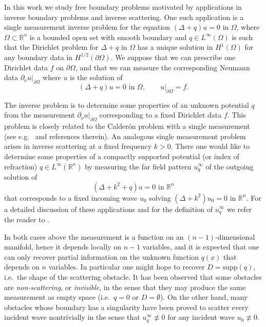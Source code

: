 \documentclass[11pt,a4paper]{amsart}
\theoremstyle{definition}
\numberwithin{equation}{section}
\newcommand{\mR}{\mathbb{R}}                    %
\newcommand{\supp}{\mathrm{supp}}
\newcommand{\p}{\partial}
\begin{document}
In this work we study free boundary problems motivated by applications in inverse boundary problems and inverse scattering. One such application is a single measurement inverse problem for the equation $(\Delta+q)u = 0$ in $\Omega$, where $\Omega \subset \mR^n$ is a bounded open set with smooth boundary and $q \in L^{\infty}(\Omega)$ is such that the Dirichlet problem for $\Delta+q$ in $\Omega$ has a unique solution in $H^1(\Omega)$ for any boundary data in $H^{1/2}(\p \Omega)$. We suppose that we can prescribe one Dirichlet data $f$ on $\p \Omega$, and that we can measure the corresponding Neumann data $\p_{\nu} u|_{\p \Omega}$ where $u$ is the solution of 
\[
(\Delta+q)u = 0 \text{ in $\Omega$}, \qquad u|_{\p \Omega} = f.
\]

The inverse problem is to determine some properties of an unknown potential $q$ from the measurement $\p_{\nu} u|_{\p \Omega}$ corresponding to a fixed Dirichlet data $f$. This problem is closely related to the Calder\'on problem with a single measurement (see e.g.\ \cite{Alessandrini1999, LiuTsou2020} and references therein). An analogous single measurement problem arises in inverse scattering at a fixed frequency $k > 0$. There one would like to determine some properties of a compactly supported potential (or index of refraction) $q \in L^{\infty}(\mR^n)$ by measuring the far field pattern $u_q^{\infty}$ of the outgoing solution of 
\[
(\Delta+k^2+q) u = 0 \text{ in $\mR^n$}
\]
that corresponds to a fixed incoming wave $u_0$ solving $(\Delta+k^2)u_0 = 0$ in $\mR^n$. For a detailed discussion of these applications and for the definition of $u_q^{\infty}$ we refer the reader to \cite{SaloShahgholian}. 

In both cases above the measurement is a function on an $(n-1)$-dimensional manifold, hence it depends locally on $n-1$ variables, and it is expected that one can only recover partial information on the unknown function $q(x)$ that depends on $n$ variables. In particular one might hope to recover $D = \supp(q)$, i.e.\ the shape of the scattering obstacle. It has been observed that some obstacles are \emph{non-scattering}, or \emph{invisible}, in the sense that they may produce the same measurement as empty space (i.e.\ $q=0$ or $D = \emptyset$). On the other hand, many obstacles whose boundary has a singularity have been proved to scatter every incident wave nontrivially in the sense that $u_q^{\infty} \not\equiv 0$ for any incident wave $u_0 \not\equiv 0$.
\end{document}
